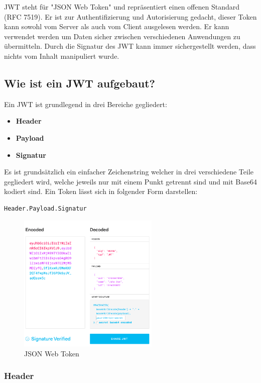 JWT steht für "JSON Web Token" und repräsentiert einen offenen Standard (RFC 7519). Er ist zur Authentifizierung und Autorisierung gedacht, dieser Token kann sowohl vom Server als auch vom Client ausgelesen werden. Er kann verwendet werden um Daten sicher zwischen verschiedenen Anwendungen zu übermitteln. Durch die Signatur des JWT kann immer sichergestellt werden, dass nichts vom Inhalt manipuliert wurde.


\subsection{Wie ist ein JWT aufgebaut?}
Ein JWT ist grundlegend in drei Bereiche gegliedert:

\begin{itemize}
\item \textbf{Header}
\item \textbf{Payload}
\item \textbf{Signatur}
\end{itemize}

Es ist grundsätzlich ein einfacher Zeichenstring welcher in drei verschiedene Teile gegliedert wird, welche jeweils nur mit einem Punkt getrennt sind und mit Base64 kodiert sind. Ein Token lässt sich in folgender Form darstellen:

\begin{lstlisting}
Header.Payload.Signatur
\end{lstlisting}


\begin{figure}[h!]
    \centering
    \includegraphics[width=0.6\textwidth]{pics/jwt.png}
    \caption{JSON Web Token}
    \label{fig:enter-label}
\end{figure}


\subsubsection{Header}

